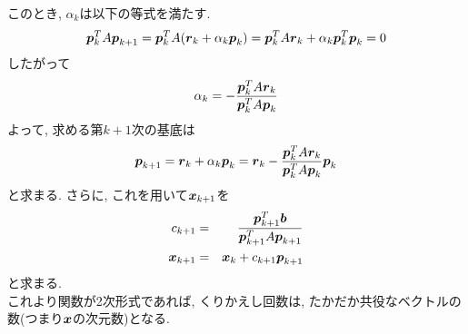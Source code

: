 \documentclass[dvipdfmx,a4j]{jsarticle}
\begin{document}
このとき, $\alpha_{k}$は以下の等式を満たす.
\begin{eqnarray*}
    \mbox{\boldmath $p$}_{k}^{T}A\mbox{\boldmath $p$}_{k+1}=\mbox{\boldmath $p$}_{k}^{T}A(\mbox{\boldmath $r$}_{k}+\alpha_{k}\mbox{\boldmath $p$}_{k})=\mbox{\boldmath $p$}_{k}^{T}A\mbox{\boldmath $r$}_{k}+\alpha_{k}\mbox{\boldmath $p$}_{k}^{T}\mbox{\boldmath $p$}_{k}=0 
\end{eqnarray*}
したがって
\begin{eqnarray*}
    \alpha_{k}=-\frac{\mbox{\boldmath $p$}_{k}^{T}A\mbox{\boldmath $r$}_{k}}{\mbox{\boldmath $p$}_{k}^{T}A\mbox{\boldmath $p$}_{k}}
\end{eqnarray*}
よって, 求める第$k+1$次の基底は
\begin{eqnarray*}
    \mbox{\boldmath $p$}_{k+1}=\mbox{\boldmath $r$}_{k}+\alpha_{k}\mbox{\boldmath $p$}_{k}=\mbox{\boldmath $r$}_{k}-\frac{\mbox{\boldmath $p$}_{k}^{T}A\mbox{\boldmath $r$}_{k}}{\mbox{\boldmath $p$}_{k}^{T}A\mbox{\boldmath $p$}_{k}}\mbox{\boldmath $p$}_{k} 
\end{eqnarray*}
と求まる. さらに, これを用いて$\mbox{\boldmath $x$}_{k+1}$を
\begin{eqnarray*}
    c_{k+1}&=&\frac{\mbox{\boldmath $p$}_{k+1}^{T}\mbox{\boldmath $b$}}{\mbox{\boldmath $p$}_{k+1}^{T}A\mbox{\boldmath $p$}_{k+1}}\\
    \mbox{\boldmath $x$}_{k+1}&=&\mbox{\boldmath $x$}_{k}+c_{k+1}\mbox{\boldmath $p$}_{k+1}
\end{eqnarray*}
と求まる.\\
これより関数が2次形式であれば, くりかえし回数は, たかだか共役なベクトルの数(つまり$\mbox{\boldmath $x$}$の次元数)となる.
\end{document}
